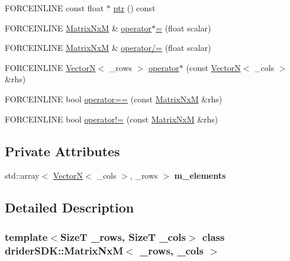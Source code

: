 \begin{DoxyCompactItemize}
F\+O\+R\+C\+E\+I\+N\+L\+I\+NE const float $\ast$ \hyperlink{classdrider_s_d_k_1_1_matrix_nx_m_a83a52f8f520f04a41d0f47e09b1bdbe4}{ptr} () const
\item 
F\+O\+R\+C\+E\+I\+N\+L\+I\+NE \hyperlink{classdrider_s_d_k_1_1_matrix_nx_m}{Matrix\+NxM} \& \hyperlink{classdrider_s_d_k_1_1_matrix_nx_m_a437229488a712e6e1da52915cfa8bdef}{operator$\ast$=} (float scalar)
\item 
F\+O\+R\+C\+E\+I\+N\+L\+I\+NE \hyperlink{classdrider_s_d_k_1_1_matrix_nx_m}{Matrix\+NxM} \& \hyperlink{classdrider_s_d_k_1_1_matrix_nx_m_adade639467244032a0d1753abaa59b72}{operator/=} (float scalar)
\item 
F\+O\+R\+C\+E\+I\+N\+L\+I\+NE \hyperlink{classdrider_s_d_k_1_1_vector_n}{VectorN}$<$ \+\_\+rows $>$ \hyperlink{classdrider_s_d_k_1_1_matrix_nx_m_aa90e6b889b38164908ca36a23e86b89a}{operator$\ast$} (const \hyperlink{classdrider_s_d_k_1_1_vector_n}{VectorN}$<$ \+\_\+cols $>$ \&rhs)
\item 
F\+O\+R\+C\+E\+I\+N\+L\+I\+NE bool \hyperlink{classdrider_s_d_k_1_1_matrix_nx_m_a20df7eaed663a20c7689e1de68b13b0f}{operator==} (const \hyperlink{classdrider_s_d_k_1_1_matrix_nx_m}{Matrix\+NxM} \&rhs)
\item 
F\+O\+R\+C\+E\+I\+N\+L\+I\+NE bool \hyperlink{classdrider_s_d_k_1_1_matrix_nx_m_a308f6fe8d904bafea034dd30325e95ee}{operator!=} (const \hyperlink{classdrider_s_d_k_1_1_matrix_nx_m}{Matrix\+NxM} \&rhs)
\end{DoxyCompactItemize}
\subsection*{Private Attributes}
\begin{DoxyCompactItemize}
\item 
\mbox{\label{classdrider_s_d_k_1_1_matrix_nx_m_a388811156a80dcca3ba0263ed18d71e3}} 
std\+::array$<$ \hyperlink{classdrider_s_d_k_1_1_vector_n}{VectorN}$<$ \+\_\+cols $>$, \+\_\+rows $>$ {\bfseries m\+\_\+elements}
\end{DoxyCompactItemize}


\subsection{Detailed Description}
\subsubsection*{template$<$SizeT \+\_\+rows, SizeT \+\_\+cols$>$\newline
class drider\+S\+D\+K\+::\+Matrix\+Nx\+M$<$ \+\_\+rows, \+\_\+cols $>$}

